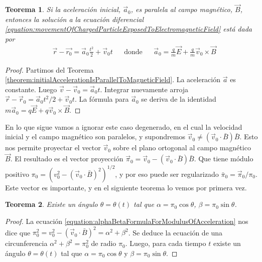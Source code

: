 \documentclass{article}
\newtheorem{theorem}{Teorema}
\begin{document}
  \begin{theorem}
    Si la aceleración inicial, \(\vec{a}_0\), es paralela al campo magnético, \(\vec{B}\), entonces la solución a la ecuación diferencial \eqref{equation:movementOfChargedParticleExposedToElectromagneticField}
    está dada por
    \begin{align}
      &\vec{r} - \vec{r_0}
      =
      \vec{a}_0 \frac{t^2}{2} + \vec{v}_0 t
      && \text{donde}
      && \vec{a}_0 = \frac{q}{m} \vec{E} + \frac{q}{m} \vec{v}_0 \times \vec{B}
    \end{align}
  \end{theorem}
  \begin{proof}
    Partimos del Teorema \ref{theorem:initialAccelerationIsParallelToMagneticField}.
    La aceleración \(\vec{a}\) es constante.
    Luego \(\vec{v} - \vec{v}_0 = \vec{a}_0 t\).
    Integrar nuevamente arroja \(\vec{r} - \vec{r}_0 = \vec{a}_0 t^2 / 2 + \vec{v}_0 t\).
    La fórmula para \(\vec{a}_0\) se deriva de la identidad \(m \vec{a}_0 = q \vec{E} + q \vec{v}_0 \times \vec{B}\).
  \end{proof}

  En lo que sigue vamos a ignorar este caso degenerado, en el cual la velocidad inicial y el campo magnético son paralelos, y supondremos \(\vec{v}_0 \neq (\vec{v}_0 \cdot \bar{B}) \bar{B}\).
  Esto nos permite proyectar el vector \(\vec{v}_0\) sobre el plano ortogonal al campo magnético \(\vec{B}\).
  El resultado es el vector proyección \(\vec{\pi}_0 = \vec{v}_0 - (\vec{v}_0 \cdot \bar{B}) \bar{B}\).
  Que tiene módulo positivo \(\pi_0 = (v_0^2 - (\vec{v}_0 \cdot \bar{B})^2)^{1 / 2}\), y por eso puede ser regularizado \(\bar{\pi}_0 = \vec{\pi}_0 / \pi_0\).
  Este vector es importante, y en el siguiente teorema lo vemos por primera vez.

  \begin{theorem}
    \label{theorem:alphaBetaDescribeCircularMotion}
    Existe un ángulo \(\theta = \theta(t)\) tal que \(\alpha = \pi_0 \cos \theta\), \(\beta = \pi_0 \sin \theta\).
  \end{theorem}
  \begin{proof}
    La ecuación \ref{equation:alphaBetaFormulaForModulusOfAcceleration} nos dice que \(\pi_0^2 = v_0^2 - (\vec{v}_0 \cdot \bar{B})^2 = \alpha^2 + \beta^2\).
    Se deduce la ecuación de una circunferencia \(\alpha^2 + \beta^2 = \pi_0^2\) de radio \(\pi_0\).
    Luego, para cada tiempo \(t\) existe un ángulo \(\theta = \theta(t)\) tal que \(\alpha = \pi_0 \cos \theta\) y \(\beta = \pi_0 \sin \theta\).
  \end{proof}
\end{document}
